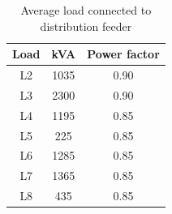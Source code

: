 \begin{table}[!h]
\caption{Average load connected to distribution feeder}
\label{tab:load_data}
\centering
\begin{tabular}{|c|c|c|}
\hline
Load & kVA & Power factor \\ \hline
L2 & 1035 & 0.90 \\ \hline
L3 & 2300 & 0.90 \\ \hline
L4 & 1195 & 0.85 \\ \hline
L5 & 225 & 0.85 \\ \hline
L6 & 1285 & 0.85 \\ \hline
L7 & 1365 & 0.85 \\ \hline
L8 & 435 & 0.85 \\ \hline
\end{tabular}
\end{table}

